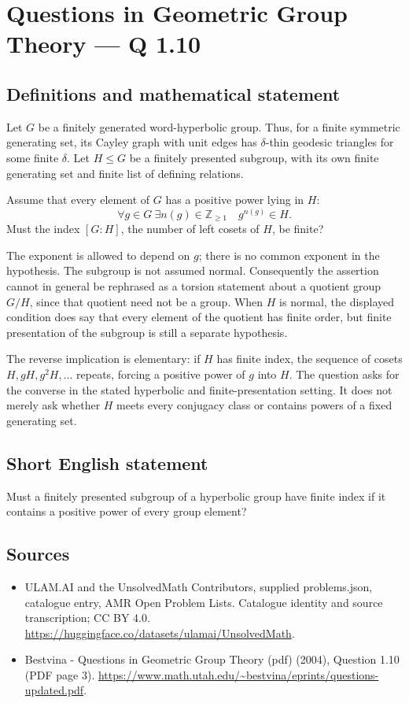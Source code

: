 \documentclass[11pt,a4paper]{article}
\begin{document}
\section*{Questions in Geometric Group Theory — Q 1.10}\label{statement}

\subsection{Definitions and mathematical statement}
Let $G$ be a finitely generated word-hyperbolic group. Thus, for a finite symmetric generating set, its Cayley graph with unit edges has $\delta$-thin geodesic triangles for some finite $\delta$. Let $H\leq G$ be a finitely presented subgroup, with its own finite generating set and finite list of defining relations.

Assume that every element of $G$ has a positive power lying in $H$:
\[
 \forall g\in G\ \exists n(g)\in\mathbb Z_{\geq1}
          \quad g^{n(g)}\in H.
\]
Must the index $[G:H]$, the number of left cosets of $H$, be finite?

The exponent is allowed to depend on $g$; there is no common exponent in the hypothesis. The subgroup is not assumed normal. Consequently the assertion cannot in general be rephrased as a torsion statement about a quotient group $G/H$, since that quotient need not be a group. When $H$ is normal, the displayed condition does say that every element of the quotient has finite order, but finite presentation of the subgroup is still a separate hypothesis.

The reverse implication is elementary: if $H$ has finite index, the sequence of cosets $H,gH,g^2H,\ldots$ repeats, forcing a positive power of $g$ into $H$. The question asks for the converse in the stated hyperbolic and finite-presentation setting. It does not merely ask whether $H$ meets every conjugacy class or contains powers of a fixed generating set.
\subsection{Short English statement}
Must a finitely presented subgroup of a hyperbolic group have finite index if it contains a positive power of every group element?
\subsection{Sources}
\begin{itemize}
\item[S1] ULAM.AI and the UnsolvedMath Contributors, supplied problems.json, catalogue entry, AMR Open Problem Lists. Catalogue identity and source transcription; CC BY 4.0.
\url{https://huggingface.co/datasets/ulamai/UnsolvedMath}.
\item[S2] Bestvina - Questions in Geometric Group Theory (pdf) (2004), Question 1.10 (PDF page 3). 
\url{https://www.math.utah.edu/~bestvina/eprints/questions-updated.pdf}.
\end{itemize}
\end{document}

